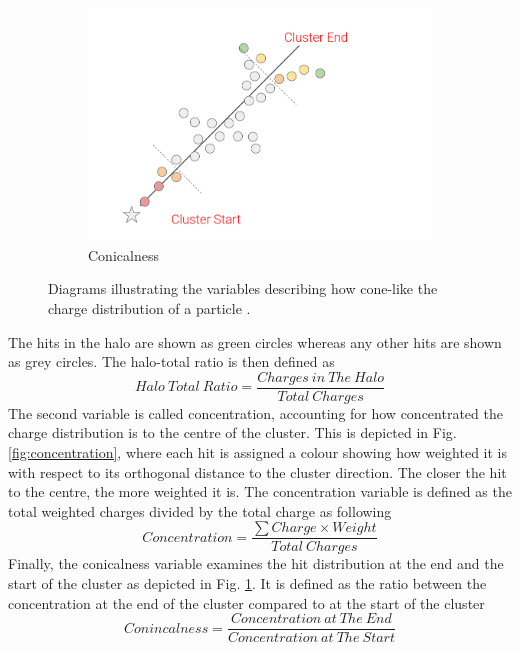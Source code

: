 \begin{figure}[bp!]
\begin{subfigure}[b]{0.495\textwidth}
            \includegraphics[width=\textwidth]{Conicalness}
            \caption{Conicalness}%
            \label{fig:conicalness}
        \end{subfigure}
        \caption[cone_variables]{
	Diagrams illustrating the variables describing how cone-like the charge distribution of a particle .
	}
        \label{fig:cone_variables}
\end{figure}
The hits in the halo are shown as green circles whereas any other hits are shown as grey circles.
The halo-total ratio is then defined as 
\begin{equation}
	Halo\ Total\ Ratio = \frac{Charges\ in\ The\ Halo}{Total\ Charges}
\end{equation}
The second variable is called concentration, accounting for how concentrated the charge distribution is to the centre of the cluster.
This is depicted in Fig. \ref{fig:concentration}, where each hit is assigned a colour showing how weighted it is with respect to its orthogonal distance to the cluster direction.
The closer the hit to the centre, the more weighted it is.
The concentration variable is defined as the total weighted charges divided by the total charge as following
\begin{equation}
	Concentration = \frac{\sum Charge \times Weight}{Total\ Charges}
\end{equation}
Finally, the conicalness variable examines the hit distribution at the end and the start of the cluster as depicted in Fig. \ref{fig:conicalness}. 
It is defined as the ratio between the concentration at the end of the cluster compared to at the start of the cluster
\begin{equation}
	Conincalness = \frac{Concentration\ at\ The\ End}{Concentration\ at\ The\ Start}
\end{equation}

